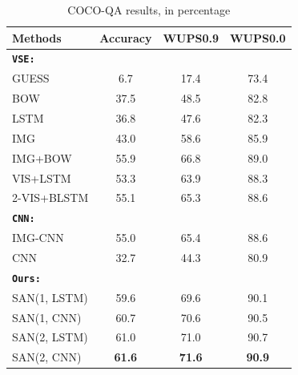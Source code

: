 \documentclass[10pt,twocolumn,letterpaper]{article}
\begin{document}
\begin{table}[!thbp]
  \vspace{-0.5cm}
      \centering
  \begin{tabular}{l  c  c  c }
    \toprule
    Methods & Accuracy & WUPS0.9 &  WUPS0.0
    \\
    \midrule
    {\bf\texttt{VSE:}} \cite{ren2015imageqa} \\
    GUESS  & 6.7 & 17.4 & 73.4 \\
    BOW & 37.5 & 48.5 & 82.8 \\
    LSTM & 36.8 & 47.6 & 82.3 \\
    IMG & 43.0 & 58.6 & 85.9 \\
    IMG+BOW & 55.9 & 66.8 & 89.0 \\
    VIS+LSTM & 53.3 & 63.9 & 88.3 \\
    2-VIS+BLSTM & 55.1 & 65.3 & 88.6 \\
    \midrule
    {\bf \texttt{CNN:}} \cite{ma2015learning} \\
    IMG-CNN & 55.0 & 65.4 & 88.6 \\
    CNN & 32.7 & 44.3 & 80.9 \\
    \midrule
    {\bf \texttt{Ours:}} \\
    SAN(1, LSTM) & 59.6 & 69.6 & 90.1 \\
    SAN(1, CNN) & 60.7 & 70.6 & 90.5 \\
    SAN(2, LSTM) & 61.0 & 71.0 & 90.7 \\
    SAN(2, CNN) & {\bf 61.6} & {\bf 71.6} & {\bf 90.9} \\
    \bottomrule
  \end{tabular}
\caption{COCO-QA results, in percentage}
\label{tab:coco_results}
\end{table}
\end{document}
